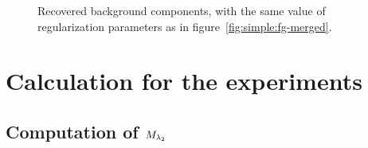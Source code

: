     \vfill

    \begin{figure}[p]
        \caption{Recovered background components, with the same value of regularization parameters as in figure~\ref{fig:simple:fg-merged}.}
        \label{fig:simple:bg}        
    \end{figure}




\clearpage
\section{Calculation for the experiments}
    \label{app:calculation}

    \subsection{Computation of \texorpdfstring{$M_{\lambda_{2}}$}{M lambda 2}}

